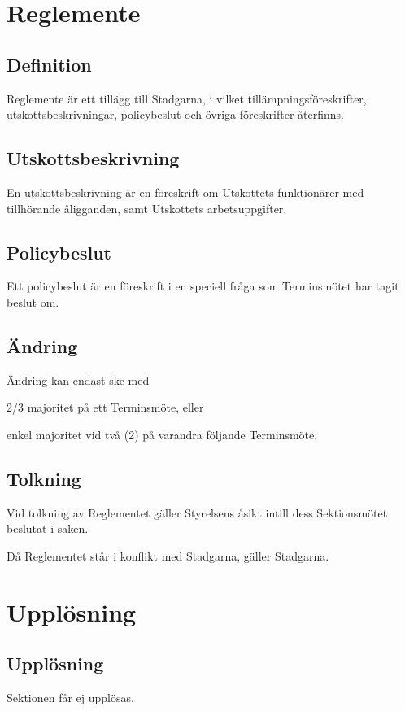 \documentclass[10pt]{article}
\begin{document}
    \section{Reglemente}
    \subsection{Definition}
    Reglemente är ett tillägg till Stadgarna, i vilket tillämpningsföreskrifter,
    utskottsbeskrivningar, policybeslut och övriga föreskrifter återfinns.
    
    \subsection{Utskottsbeskrivning}
    En utskottsbeskrivning är en föreskrift om Utskottets funktionärer med
    tillhörande åligganden, samt Utskottets arbetsuppgifter.
    
    \subsection{Policybeslut}
    Ett policybeslut är en föreskrift i en speciell fråga som Terminsmötet har
    tagit beslut om.
    
    \subsection{Ändring}
    Ändring kan endast ske med
    \begin{alphlist}
    \item 2/3 majoritet på ett Terminsmöte, eller
    \item enkel majoritet vid två (2) på varandra följande Terminsmöte.
    \end{alphlist}
    
    \subsection{Tolkning}
    Vid tolkning av Reglementet gäller Styrelsens åsikt intill dess Sektionsmötet
    beslutat i saken.
    
    Då Reglementet står i konflikt med Stadgarna, gäller Stadgarna.
    
    \newpage
    \section{Upplösning}
    \subsection{Upplösning}
    Sektionen får ej upplösas.
    \newpage
    
\end{document}
